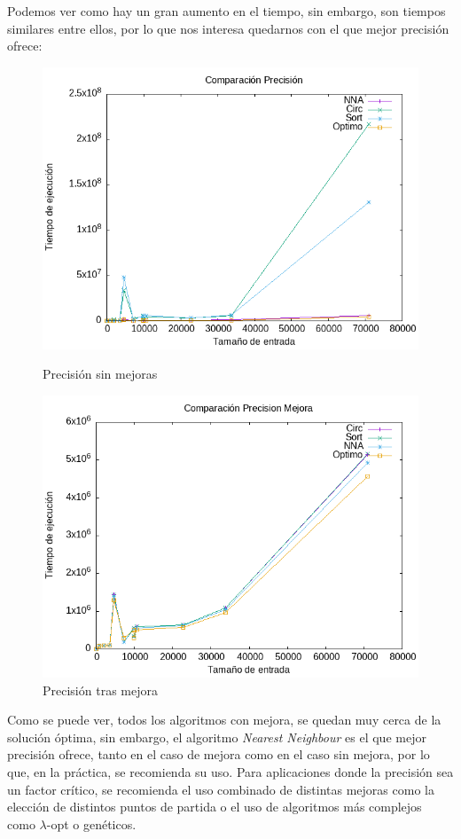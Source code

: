 \documentclass[11pt,openany]{book}
\begin{document}
Podemos ver como hay un gran aumento en el tiempo, sin embargo, son tiempos
similares entre ellos, por lo que nos interesa quedarnos con el que mejor precisión
ofrece:
\begin{figure}[H]
      \centering
      \begin{minipage}{.48\textwidth}
            \centering
            \includegraphics[width=1\linewidth]{assets/Img/Precision.png}
            \caption{Precisión sin mejoras}
            \label{fig:nearest}
      \end{minipage}%
      \begin{minipage}{.48\textwidth}
            \centering
            \includegraphics[width=1\linewidth]{assets/Img/PrecisionMejora.png}
            \caption{Precisión tras mejora}
            \label{fig:ordered}
      \end{minipage}
\end{figure}
Como se puede ver, todos los algoritmos con mejora, se quedan muy cerca
de la solución óptima, sin embargo, el algoritmo \textit{Nearest Neighbour}
es el que mejor precisión ofrece, tanto en el caso de mejora como 
en el caso sin mejora, por lo que, en la práctica, se recomienda su uso. Para 
aplicaciones donde la precisión sea un factor crítico, se recomienda el uso
combinado de distintas mejoras como la elección de distintos puntos de partida
o el uso de algoritmos más complejos como $\lambda$-opt o genéticos.
\end{document}
